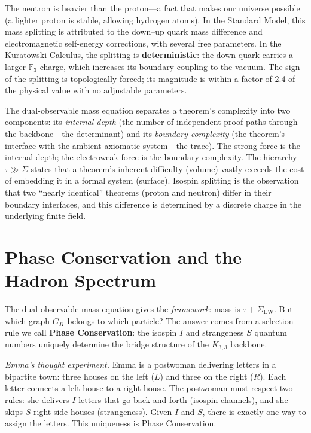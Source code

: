 \documentclass[11pt, a4paper, openany]{book}
\begin{document}
\noindent
The neutron is heavier than the proton---a fact that makes our universe
possible (a lighter proton is stable, allowing hydrogen atoms).  In the
Standard Model, this mass splitting is attributed to the down--up quark
mass difference and electromagnetic self-energy corrections, with several
free parameters.  In the Kuratowski Calculus, the splitting is
\textbf{deterministic}: the down quark carries a larger $\mathbb{F}_3$
charge, which increases its boundary coupling to the vacuum.  The sign
of the splitting is topologically forced; its magnitude is within a
factor of 2.4 of the physical value with no adjustable parameters.

\begin{logicalreading}
The dual-observable mass equation separates a theorem's complexity into
two components: its \emph{internal depth} (the number of independent
proof paths through the backbone---the determinant) and its
\emph{boundary complexity} (the theorem's interface with the ambient
axiomatic system---the trace).  The strong force is the internal depth;
the electroweak force is the boundary complexity.  The hierarchy
$\tau \gg \Sigma$ states that a theorem's inherent difficulty (volume)
vastly exceeds the cost of embedding it in a formal system (surface).
Isospin splitting is the observation that two ``nearly identical''
theorems (proton and neutron) differ in their boundary interfaces,
and this difference is determined by a discrete charge in the
underlying finite field.
\end{logicalreading}


\section{Phase Conservation and the Hadron Spectrum}\label{sec:phase-conservation}

The dual-observable mass equation gives the \emph{framework}: mass is
$\tau + \Sigma_{\mathrm{EW}}$.  But which graph $G_K$ belongs to which
particle?  The answer comes from a selection rule we call
\textbf{Phase Conservation}: the isospin $I$ and strangeness $S$
quantum numbers uniquely determine the bridge structure of the
$K_{3,3}$ backbone.

\smallskip\noindent
\textit{Emma's thought experiment.}
Emma is a postwoman delivering letters in a bipartite town: three houses
on the left ($L$) and three on the right ($R$).  Each letter connects a
left house to a right house.  The postwoman must respect two rules:
she delivers $I$ letters that go back and forth (isospin channels), and
she skips $S$ right-side houses (strangeness).  Given $I$ and $S$,
there is exactly one way to assign the letters.  This uniqueness is
Phase Conservation.
\smallskip
\end{document}
